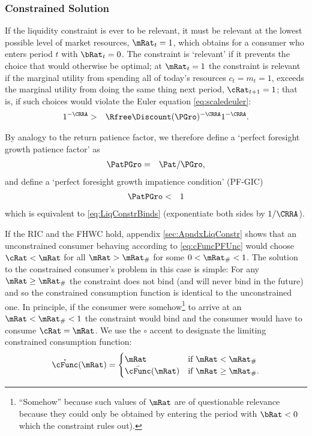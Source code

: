 \documentclass[titlepage]{\econtex}\providecommand{\texname}{BufferStockTheory}%
\begin{document}
\subsubsection{Constrained Solution}

If the liquidity constraint is ever to be relevant, it must be
relevant at the lowest possible level of market resources,
$\mRat_{t}=1$, which obtains for a consumer who enters period $t$ with
$\bRat_{t}=0$.  The constraint is `relevant' if
it prevents the choice that would otherwise be optimal; at
$\mRat_{t}=1$ the constraint is relevant if the marginal utility from spending all of today's
resources $c_{t}=m_{t}=1$, exceeds the marginal utility from
doing the same thing next period, $\cRat_{t+1}=1$; that is, if such
choices would violate the Euler equation \eqref{eq:scaledeuler}:
\begin{eqnarray}
    1^{-\CRRA} & > & \Rfree \Discount (\PGro)^{-\CRRA}1^{-\CRRA}  \label{eq:LiqConstrBinds}.
\end{eqnarray}

By analogy to the return patience factor, we therefore define a `perfect
foresight growth patience factor' as
\begin{eqnarray}
  \PatPGro & = & {\Pat}/\PGro,  \label{eq:PFGPF}
\end{eqnarray}
and define a `perfect foresight growth impatience condition' (PF-GIC)
\begin{eqnarray}
  \label{eq:PFGIC}
  \PatPGro &  < &  1
\end{eqnarray}
which is equivalent to \eqref{eq:LiqConstrBinds} (exponentiate both
sides by $1/\CRRA$).

If the RIC and the FHWC hold, appendix \ref{sec:ApndxLiqConstr} shows
that an unconstrained consumer behaving according to
\eqref{eq:cFuncPFUnc} would choose $\cRat < \mRat$ for all $\mRat >
\mRat_{\#}$ for some $0 < \mRat_{\#} < 1$.  The solution to the
constrained consumer's problem in this case is simple: For any $\mRat
\geq \mRat_{\#}$ the constraint does not bind (and will never bind in
the future) and so the constrained consumption function is identical
to the unconstrained one.  In principle, if the consumer were somehow\footnote{``Somehow'' because such values
of $\mRat$ are of questionable relevance because they could only be
obtained by entering the period with $\bRat < 0$ which the constraint
rules out).}
to arrive at an $\mRat < \mRat_{\#} < 1$ the constraint would bind and
the consumer would have to consume $\cRat=\mRat$.  We use the $\circ$ accent to designate the limiting
constrained consumption function:
\begin{equation}
\mathring{\cFunc}(\mRat)=
\begin{cases}
 \mRat & \text{if $\mRat < \mRat_{\#}$} \\
 \bar{\cFunc}(\mRat)  & \text{if $\mRat \geq \mRat_{\#}$.}
\end{cases}
\end{equation}
\end{document}

